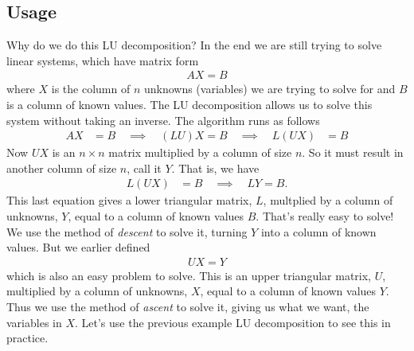 \subsection*{Usage}
Why do we do this LU decomposition? In the end we are still trying to solve linear systems, which have matrix form
\begin{align*}
AX = B
\end{align*}
where $X$ is the column of $n$ unknowns (variables) we are trying to solve for and $B$ is a column of known values. The LU decomposition allows us to solve this system without taking an inverse. The algorithm runs as follows
\begin{align*}
AX &= B \quad\implies\quad (LU)X = B \quad\implies\quad L(UX) &= B
\end{align*}
Now $UX$ is an $n\times n$ matrix multiplied by a column of size $n$. So it must result in another column of size $n$, call it $Y$. That is, we have
\begin{align*}
L\left(UX\right) &= B \quad\implies\quad  LY = B.
\end{align*}
This last equation gives a lower triangular matrix, $L$, multplied by a column of unknowns, $Y$, equal to a column of known values $B$. That's really easy to solve! We use the method of \textit{descent} to solve it, turning $Y$ into a column of known values. But we earlier defined
\begin{align*}
UX = Y
\end{align*}
which is also an easy problem to solve. This is an upper triangular matrix, $U$, multiplied by a column of unknowns, $X$, equal to a column of known values $Y$. Thus we use the method of \textit{ascent} to solve it, giving us what we want, the variables in $X$. Let's use the previous example LU decomposition to see this in practice.

